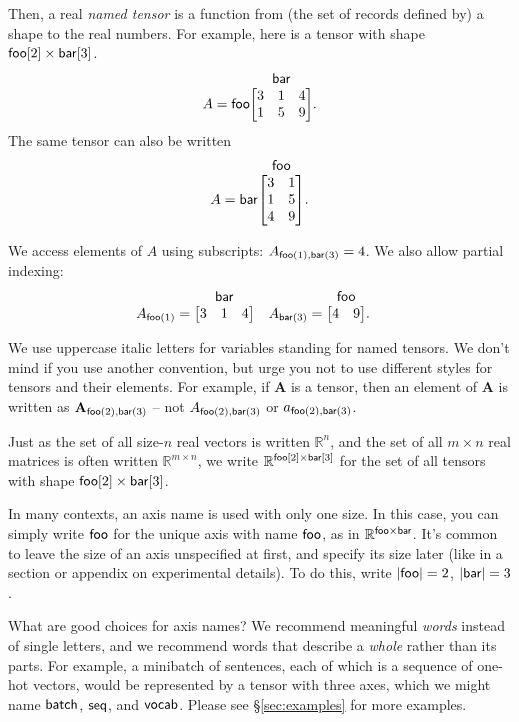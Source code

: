 \documentclass{article}
\makeatletter
\newcommand{\nmatrix}[3]{\name{#1}\begin{array}[b]{@{}c@{}}\name{#2}\\\begin{bmatrix}#3\end{bmatrix}\end{array}}
\makeatother
\begin{document}
Then, a real \emph{named tensor} is a function from (the set of records defined by) a shape to the real numbers. For example, here is a tensor with shape $\mathsf{foo}[2] \times \mathsf{bar}[3]$.
\begin{equation*}
A = \nmatrix{foo}{bar}{
  3 & 1 & 4 \\
  1 & 5 & 9
}.
\end{equation*}
The same tensor can also be written
\begin{equation*}
A = \nmatrix{bar}{foo}{
  3 & 1 \\
  1 & 5 \\
  4 & 9
}.
\end{equation*}

We access elements of $A$ using subscripts: $A_{\mathsf{foo}(1), \mathsf{bar}(3)} = 4$.
We also allow partial indexing:
\begin{align*}
A_{\nidx{foo}{1}} &= \nmatrix{}{bar}{
  3 & 1 & 4
}
&
A_{\nidx{bar}{3}} &= \nmatrix{}{foo}{
  4 & 9
}.
\end{align*}

We use uppercase italic letters for variables standing for named tensors. We don't mind if you use another convention, but urge you not to use different styles for tensors and their elements. For example, if $\mathbf{A}$ is a tensor, then an element of $\mathbf{A}$ is written as $\mathbf{A}_{\mathsf{foo}(2), \mathsf{bar}(3)}$ -- 
not $A_{\mathsf{foo}(2),\mathsf{bar}(3)}$ or $a_{\mathsf{foo}(2),\mathsf{bar}(3)}$.

Just as the set of all size-$n$ real vectors is written $\mathbb{R}^n$, and the set of all $m\times n$ real matrices is often written $\mathbb{R}^{m \times n}$, we write $\mathbb{R}^{\mathsf{foo}[2] \times \mathsf{bar}[3]}$ for the set of all tensors with shape $\mathsf{foo}[2] \times \mathsf{bar}[3]$.

In many contexts, an axis name is used with only one size. In this case, you can simply write $\mathsf{foo}$ for the unique axis with name $\mathsf{foo}$, as in $\mathbb{R}^{\mathsf{foo} \times \mathsf{bar}}$. It's common to leave the size of an axis unspecified at first, and specify its size later (like in a section or appendix on experimental details). To do this, write $|\mathsf{foo}|=2$, $|\mathsf{bar}|=3$.

What are good choices for axis names? We recommend meaningful \emph{words} instead of single letters, and we recommend words that describe a \emph{whole} rather than its parts. For example, a minibatch of sentences, each of which is a sequence of one-hot vectors, would be represented by a tensor with three axes, which we might name $\mathsf{batch}$, $\mathsf{seq}$, and $\mathsf{vocab}$. Please see \S\ref{sec:examples} for more examples.
\end{document}
